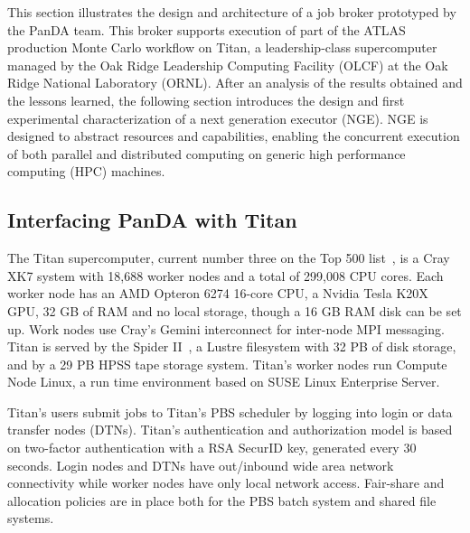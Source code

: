 This section illustrates the design and architecture of a job broker prototyped
by the PanDA team. This broker supports execution of part of the ATLAS
production Monte Carlo workflow on Titan, a leadership-class supercomputer
managed by the Oak Ridge Leadership Computing Facility (OLCF) at the Oak Ridge
National Laboratory (ORNL). After an analysis of the results obtained and the
lessons learned, the following section introduces the design and first
experimental characterization of a next generation executor (NGE). NGE is
designed to abstract resources and capabilities, enabling the concurrent
execution of both parallel and distributed computing on generic high performance
computing (HPC) machines.


\subsection{Interfacing PanDA with Titan}
\label{ssec:panda-titan}

The Titan supercomputer, current number three on the Top 500 list~\cite{top500},
is a Cray XK7 system with 18,688 worker nodes and a total of 299,008 CPU cores.
Each worker node has an AMD Opteron  6274 16-core CPU, a Nvidia Tesla K20X GPU,
32 GB of RAM and no local storage, though a 16 GB RAM disk can be set up. Work
nodes use Cray’s Gemini interconnect for inter-node MPI messaging. Titan is
served by the Spider II~\cite{oral2013olcf}, a Lustre filesystem with 32 PB of
disk storage, and by a 29 PB HPSS tape storage system. Titan’s worker nodes run
Compute Node Linux, a run time environment based on SUSE Linux Enterprise
Server.


Titan's users submit jobs to Titan's PBS scheduler by logging into login or data
transfer nodes (DTNs). Titan's authentication and authorization model is based
on two-factor authentication with a RSA SecurID key, generated every 30 seconds.
Login nodes and DTNs have out/inbound wide area network connectivity while
worker nodes have only local network access. Fair-share and allocation policies
are in place both for the PBS batch system and shared file systems.

